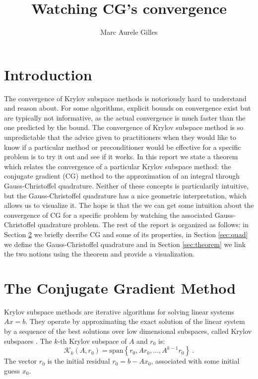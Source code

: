 \documentclass[10pt,a4paper]{article}
\begin{document}
\title{Watching CG's convergence }
\author{Marc Aurele Gilles}
\maketitle

\section{Introduction}

The convergence of Krylov subspace methods is notoriously hard to understand and reason about. For some algorithms, explicit bounds on convergence exist but are typically not informative, as the actual convergence is much faster than the one predicted by the bound. The convergence of Krylov subspace method is so unpredictable that the advice given to practitioners when they would like to know if a particular method or preconditioner would be effective for a specific problem is to try it out and see if it works. In this report we state a theorem which relates the convergence of a particular Krylov subspace method: the conjugate gradient (CG) method to the approximation of an integral through Gauss-Christoffel quadrature. 
Neither of these concepts is particularily intuitive, but the Gauss-Christoffel quadrature has a nice geometric interpretation, which allows us to visualize it. The hope is that the we can get some intuition about the convergence of CG for a specific problem by watching the associated Gauss-Christoffel quadrature problem.
The rest of the report is organized as follows: in Section \ref{sec:CG} we briefly decribe CG and some of its properties, in Section \ref{sec:quad} we define the Gauss-Christoffel quadrature and in Section \ref{sec:theorem} we link the two notions using the theorem and provide a visualization.



\section{The Conjugate Gradient Method} \label{sec:CG}

Krylov subspace methods are iterative algorithms for solving linear systems $Ax=b$. They operate by approximating the exact solution of the linear system by a sequence of the best solutions over low dimensional subspaces, called Krylov subspaces \cite{liesen_strakoss_zdenek_2013}. The $k$-th Krylov subspace of $A$ and $r_0$ is:
\begin{equation}
\mathcal{K}_k\left( A, r_0\right) = \text{span}\left\lbrace r_0, Ar_0, \dots, A^{k-1}r_0 \right\rbrace \ .
\end{equation} 
The vector $r_0$ is the initial residual $r_0 = b - Ax_0$, associated with some initial guess $x_0$.
\end{document}
